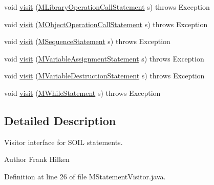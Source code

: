 \begin{DoxyCompactItemize}
void \hyperlink{interfaceorg_1_1tzi_1_1use_1_1uml_1_1sys_1_1soil_1_1_m_statement_visitor_a91f7a5d78d7a6a068005425bb84c18ab}{visit} (\hyperlink{classorg_1_1tzi_1_1use_1_1uml_1_1sys_1_1soil_1_1_m_library_operation_call_statement}{M\-Library\-Operation\-Call\-Statement} s)  throws Exception
\item 
void \hyperlink{interfaceorg_1_1tzi_1_1use_1_1uml_1_1sys_1_1soil_1_1_m_statement_visitor_ad87f8e34cb4d02dba3c2458d0c147ead}{visit} (\hyperlink{classorg_1_1tzi_1_1use_1_1uml_1_1sys_1_1soil_1_1_m_object_operation_call_statement}{M\-Object\-Operation\-Call\-Statement} s)  throws Exception
\item 
void \hyperlink{interfaceorg_1_1tzi_1_1use_1_1uml_1_1sys_1_1soil_1_1_m_statement_visitor_a9985dbb54203026ca1d0777c617462c7}{visit} (\hyperlink{classorg_1_1tzi_1_1use_1_1uml_1_1sys_1_1soil_1_1_m_sequence_statement}{M\-Sequence\-Statement} s)  throws Exception
\item 
void \hyperlink{interfaceorg_1_1tzi_1_1use_1_1uml_1_1sys_1_1soil_1_1_m_statement_visitor_a5d4727290c22db9ecfbbfdd8e8a36c61}{visit} (\hyperlink{classorg_1_1tzi_1_1use_1_1uml_1_1sys_1_1soil_1_1_m_variable_assignment_statement}{M\-Variable\-Assignment\-Statement} s)  throws Exception
\item 
void \hyperlink{interfaceorg_1_1tzi_1_1use_1_1uml_1_1sys_1_1soil_1_1_m_statement_visitor_a52745dd0e990fc1755dfc7fd7582fb98}{visit} (\hyperlink{classorg_1_1tzi_1_1use_1_1uml_1_1sys_1_1soil_1_1_m_variable_destruction_statement}{M\-Variable\-Destruction\-Statement} s)  throws Exception
\item 
void \hyperlink{interfaceorg_1_1tzi_1_1use_1_1uml_1_1sys_1_1soil_1_1_m_statement_visitor_ab5aae049d6bf63068ff8692e4a47bb06}{visit} (\hyperlink{classorg_1_1tzi_1_1use_1_1uml_1_1sys_1_1soil_1_1_m_while_statement}{M\-While\-Statement} s)  throws Exception
\end{DoxyCompactItemize}


\subsection{Detailed Description}
Visitor interface for S\-O\-I\-L statements. \begin{DoxyAuthor}{Author}
Frank Hilken 
\end{DoxyAuthor}


Definition at line 26 of file M\-Statement\-Visitor.\-java.



